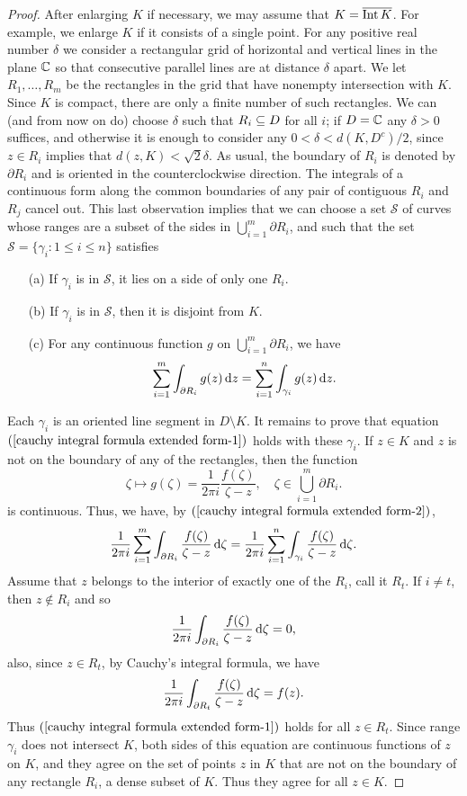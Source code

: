 \begin{proof}
After enlarging $K$ if necessary, we may assume that $K=\overline{\mathrm{Int}\, K}$. For example, we enlarge $K$ if it consists of a single point. For any positive real number $\delta$ we consider a rectangular grid of horizontal and vertical lines in the plane $\mathbb{C}$ so that consecutive parallel lines are at distance $\delta$ apart. We let $R_1,\dots,R_m$ be the rectangles in the grid that have nonempty intersection with $K$. Since $K$ is compact, there are only a finite number of such rectangles. We can (and from now on do) choose $\delta$ such that $R_i\subseteq D$ for all $i$; if $D=\mathbb{C}$ any $\delta>0$ suffices, and otherwise it is enough to consider any $0<\delta<d(K,D^c)/2$, since $z\in R_i$ implies that $d(z,K)<\sqrt{2}\delta$. As usual, the boundary of $R_i$ is denoted by $\partial R_i$ and is oriented in the counterclockwise direction. The integrals of a continuous form along the common boundaries of any pair of contiguous $R_i$ and $R_j$ cancel out. This last observation implies that we can choose a set $\mathcal{S}$ of curves whose ranges are a subset of the sides in $\bigcup_{i=1}^{m}\partial R_i$, and such that the set $\mathcal{S}=\{\gamma_i:1\leq i\leq n\}$ satisfies
\begin{itemize}
\item[(a)] If $\gamma_i$ is in $\mathcal{S}$, it lies on a side of only one $R_i$.
\item[(b)] If $\gamma_i$ is in $\mathcal{S}$, then it is disjoint from $K$.
\item[(c)] For any continuous function $g$ on $\bigcup_{i=1}^{m}\partial R_i$, we have
\begin{align}\label{cauchy integral formula extended form-2}
\sum_{i=1}^{m}\int_{\partial R_i}g(z)\mathop{}\!\mathrm{d} z=\sum_{i=1}^{n}\int_{\gamma_i}g(z)\mathop{}\!\mathrm{d} z.
\end{align}
\end{itemize}
Each $\gamma_i$ is an oriented line segment in $D\setminus K$. It remains to prove that equation $(\ref{cauchy integral formula extended form-1})$ holds with these $\gamma_i$. If $z\in K$ and $z$ is not on the boundary of any of the rectangles, then the function
\[\zeta\mapsto g(\zeta)=\frac{1}{2\pi i}\frac{f(\zeta)}{\zeta-z},\quad \zeta\in\bigcup_{i=1}^{m}\partial R_i.\]
is continuous. Thus, we have, by $(\ref{cauchy integral formula extended form-2})$,
\[\frac{1}{2\pi i}\sum_{i=1}^{m}\int_{\partial R_i}\frac{f(\zeta)}{\zeta-z}\mathop{}\!\mathrm{d}\zeta=\frac{1}{2\pi i}\sum_{i=1}^{n}\int_{\gamma_i}\frac{f(\zeta)}{\zeta-z}\mathop{}\!\mathrm{d}\zeta.\]
Assume that $z$ belongs to the interior of exactly one of the $R_i$, call it $R_t$. If $i\neq t$, then $z\notin R_i$ and so
\[\frac{1}{2\pi i}\int_{\partial R_i}\frac{f(\zeta)}{\zeta-z}\mathop{}\!\mathrm{d}\zeta=0,\]
also, since $z\in R_t$, by Cauchy's integral formula, we have
\[\frac{1}{2\pi i}\int_{\partial R_t}\frac{f(\zeta)}{\zeta-z}\mathop{}\!\mathrm{d}\zeta=f(z).\]
Thus $(\ref{cauchy integral formula extended form-1})$ holds for all $z\in R_t$. Since range $\gamma_i$ does not intersect $K$, both sides of this equation are continuous functions of $z$ on $K$, and they agree on the set of points $z$ in $K$ that are not on the boundary of any rectangle $R_i$, a dense subset of $K$. Thus they agree for all $z\in K$.
\end{proof}
